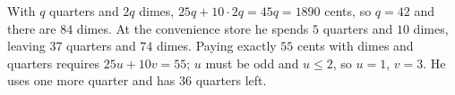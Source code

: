 With $q$ quarters and $2q$ dimes, $25q+10\cdot2q=45q=1890$ cents, so $q=42$ and there are $84$ dimes. At the convenience store he spends $5$ quarters and $10$ dimes, leaving $37$ quarters and $74$ dimes. Paying exactly $55$ cents with dimes and quarters requires $25u+10v=55$; $u$ must be odd and $u\le2$, so $u=1$, $v=3$. He uses one more quarter and has $\boxed{36}$ quarters left.
